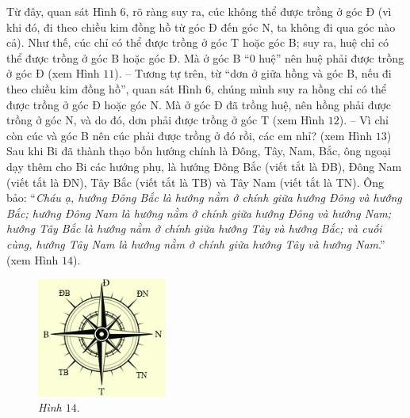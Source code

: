 	\vskip 0.1cm
	Từ đây, quan sát Hình $6$, rõ ràng suy ra, cúc không thể được trồng ở góc Đ (vì khi đó, đi theo chiều kim đồng hồ từ góc Đ đến góc N, ta không đi qua góc nào cả). Như thế, cúc chỉ có thể được trồng ở góc T hoặc góc B; suy ra, huệ chỉ có thể được trồng ở góc B hoặc góc Đ. Mà ở góc B “0 huệ” nên huệ phải được trồng ở góc Đ (xem Hình $11$).
	\vskip 0.1cm
	-- Tương tự trên, từ “dơn ở giữa hồng và góc B, nếu đi theo chiều kim đồng hồ”, quan sát Hình $6$, chúng mình suy ra hồng chỉ có thể được trồng ở góc Đ hoặc góc N. Mà ở góc Đ đã trồng huệ, nên hồng phải được trồng ở góc N, và do đó, dơn phải được trồng ở góc T (xem Hình $12$).
	\vskip 0.1cm
%			
	-- Vì chỉ còn cúc và góc B nên cúc phải được trồng ở đó rồi, các em nhỉ? (xem Hình $13$)
	\vskip 0.1cm
	Sau khi Bi đã  thành thạo bốn hướng chính là Đông, Tây, Nam, Bắc, ông ngoại dạy thêm cho Bi các hướng phụ, là hướng Đông Bắc (viết tắt là ĐB), Đông Nam (viết tắt là ĐN), Tây Bắc (viết tắt là TB) và Tây Nam (viết tắt là TN). Ông bảo:
	\vskip 0.1cm
	“\textit{Cháu ạ, hướng Đông Bắc là hướng nằm ở chính giữa hướng Đông và hướng Bắc; hướng Đông Nam là hướng nằm ở chính giữa hướng Đông và hướng Nam; hướng Tây Bắc là hướng nằm ở chính giữa hướng Tây và hướng Bắc; và cuối cùng, hướng Tây Nam là hướng nằm ở chính giữa hướng Tây và hướng Nam}.” (xem Hình $14$).
	\begin{figure}[H]
		\centering
		\captionsetup{labelformat= empty, justification=centering}
		\includegraphics[width=0.38\textwidth]{pic14}
		\caption{\small\textit{Hình $14.$}}
		\vspace*{-10pt}
	\end{figure}
